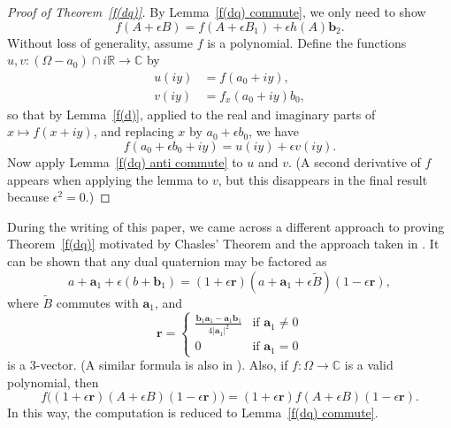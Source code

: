 \documentclass[12pt,reqno]{amsart}
\begin{document}
\begin{proof}[Proof of Theorem~\ref{f(dq)}]
By Lemma~\ref{f(dq) commute}, we only need to show
\begin{equation}
f(A+\epsilon B) = f(A + \epsilon B_1) + \epsilon h(A) \bm b_2 .
\end{equation}
Without loss of generality, assume $f$ is a polynomial.  Define the functions $u,v:(\Omega-a_0) \cap i\mathbb R \to \mathbb C$ by
\begin{align}
u(iy) &= f(a_0 + iy) , \\
v(iy) &= f_{x}(a_0 + iy) b_0,
\end{align}
so that by Lemma~\ref{f(d)}, applied to the real and imaginary parts of $x \mapsto f(x + iy)$, and replacing $x$ by $a_0 + \epsilon b_0$, we have
\begin{equation}
f(a_0 + \epsilon b_0 + i y) = u(iy) + \epsilon v(iy) .
\end{equation}
Now apply Lemma~\ref{f(dq) anti commute} to $u$ and $v$.  (A second derivative of $f$ appears when applying the lemma to $v$, but this disappears in the final result because $\epsilon^2 = 0$.)
\end{proof}

During the writing of this paper, we came across a different approach to proving Theorem~\ref{f(dq)} motivated by Chasles' Theorem and the approach taken in \cite{wang-et-al}.  It can be shown that any dual quaternion may be factored as
\begin{equation}
a + \bm a_1 + \epsilon (b + \bm b_1) = (1 + \epsilon \bm r) (a + \bm a_1 + \epsilon \tilde B) (1 - \epsilon \bm r),
\end{equation}
where $\tilde B$ commutes with $\bm a_1$, and
\begin{equation}
\bm r = \begin{cases} \frac{\bm b_1 \bm a_1 - \bm a_1 \bm b_1 }{4|\bm a_1|^2} & \text{if $\bm a_1 \ne 0$} \\ 0 & \text{if $\bm a_1 = 0$} \end{cases}
\end{equation}
is a 3-vector.  (A similar formula is also in \cite{selig}).  Also, if $f:\Omega \to \mathbb C$ is a valid polynomial, then
\begin{equation}
f\bigl((1 + \epsilon \bm r) (A + \epsilon B) (1 - \epsilon \bm r)\bigr) = (1 + \epsilon \bm r) f(A + \epsilon B) (1 - \epsilon \bm r) .
\end{equation}
In this way, the computation is reduced to Lemma~\ref{f(dq) commute}.
\end{document}
